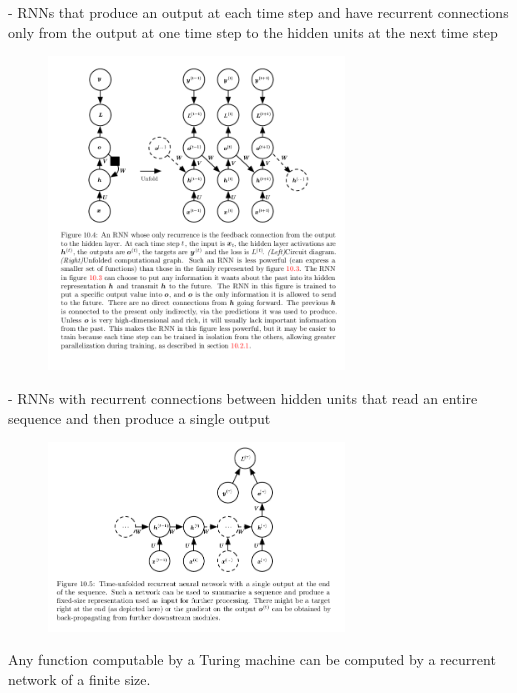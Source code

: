 \documentclass[letterpaper, 12pt]{report}
\begin{document}
- RNNs that produce an output at each time step and have recurrent connections only from the output at one time step to the hidden units at the next time step 

\begin{figure}[h]
  \centering
  \includegraphics[width=0.7\textwidth]{rnn_dp_2.png}
\end{figure}

- RNNs with recurrent connections between hidden units that read an entire sequence and then produce a single output 

\begin{figure}[h]
  \centering
  \includegraphics[width=0.7\textwidth]{rnn_dp_3.png}
\end{figure}

Any function computable by a Turing machine can be computed by a recurrent network of a finite size. 
\end{document}
